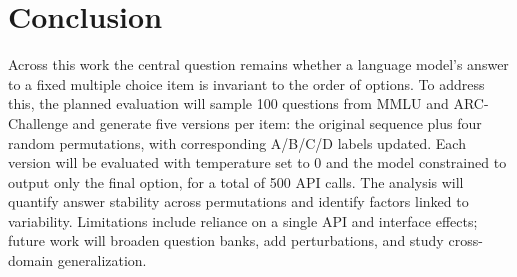\section{Conclusion}

\label{sec:conclusion}


Across this work the central question remains whether a language model's answer to a fixed multiple choice item is invariant to the order of options. To address this, the planned evaluation will sample 100 questions from MMLU and ARC-Challenge and generate five versions per item: the original sequence plus four random permutations, with corresponding A/B/C/D labels updated. Each version will be evaluated with temperature set to 0 and the model constrained to output only the final option, for a total of 500 API calls. The analysis will quantify answer stability across permutations and identify factors linked to variability. Limitations include reliance on a single API and interface effects; future work will broaden question banks, add perturbations, and study cross-domain generalization.
